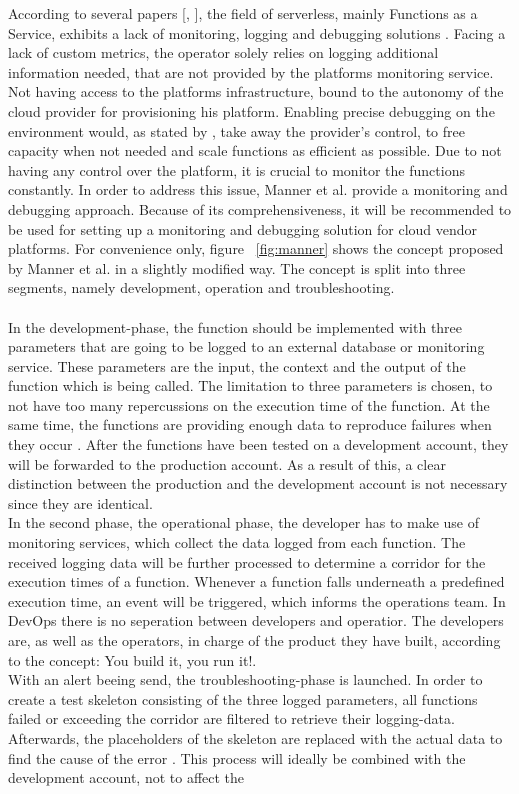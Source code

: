 \documentclass[11pt]{article}
\begin{document}
According to several papers [\cite{roberts2017serverless}, \cite{baldini2017serverless}], the field of serverless, mainly Functions as a Service, exhibits a lack of monitoring, logging and debugging solutions \cite{kritikos2018review}. Facing a lack of custom metrics, the operator solely relies on logging additional information needed, that are not provided by the platforms monitoring service. Not having access to the platforms infrastructure, bound to the autonomy of the cloud provider for provisioning his platform. Enabling precise debugging on the environment would, as stated by \cite{manner2019troubleshooting}, take away the provider's control, to free capacity when not needed and scale functions as efficient as possible. Due to not having any control over the platform, it is crucial to monitor the functions constantly. In order to address this issue, Manner et al. provide a monitoring and debugging approach. Because of its comprehensiveness, it will be recommended to be used for setting up a monitoring and debugging solution for cloud vendor platforms. For convenience only, figure ~\ref{fig:manner} shows the concept proposed by Manner et al. in a slightly modified way. The concept is split into three segments, namely development, operation and troubleshooting.\\\\ In the development-phase, the function should be implemented with three parameters that are going to be logged to an external database or monitoring service. These parameters are the input, the context and the output of the function which is being called. The limitation to three parameters is chosen, to not have too many repercussions on the execution time of the function. At the same time, the functions are providing enough data to reproduce failures when they occur \cite{manner2019troubleshooting}. After the functions have been tested on a development account, they will be forwarded to the production account. As a result of this, a clear distinction between the production and the development account is not necessary since they are identical. \\ In the second phase, the operational phase, the developer has to make use of monitoring services, which collect the data logged from each function. The received logging data will be further processed to determine a corridor for the execution times of a function. Whenever a function falls underneath a predefined execution time, an event will be triggered, which informs the operations team. In DevOps there is no seperation between developers and operatior. The developers are, as well as the operators, in charge of the product they have built, according to the concept: \glqq You build it, you run it!\grqq{}.\\ With an alert beeing send, the troubleshooting-phase is launched. In order to create a test skeleton consisting of the three logged parameters, all functions failed or exceeding the corridor are filtered to retrieve their logging-data. Afterwards, the placeholders of the skeleton are replaced with the actual data to find the cause of the error \cite{manner2019troubleshooting}. This process will ideally be combined with the development account, not to affect the 
\end{document}
